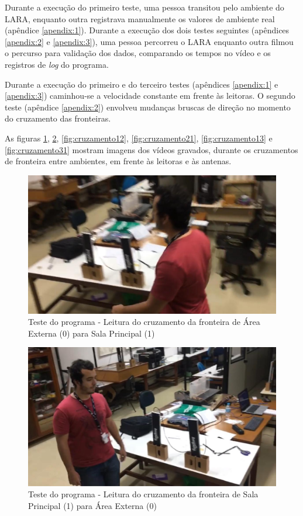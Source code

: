 Durante a execução do primeiro teste, uma pessoa transitou pelo ambiente do LARA, enquanto outra registrava manualmente os valores de ambiente real (apêndice \ref{apendix:1}). Durante a execução dos dois testes seguintes (apêndices \ref{apendix:2} e \ref{apendix:3}), uma pessoa percorreu o LARA enquanto outra filmou o percurso para validação dos dados, comparando os tempos no vídeo e os registros de \textit{log} do programa.

Durante a execução do primeiro e do terceiro testes (apêndices \ref{apendix:1} e \ref{apendix:3}) caminhou-se a velocidade constante em frente às leitoras. O segundo teste (apêndice \ref{apendix:2}) envolveu mudanças bruscas de direção no momento do cruzamento das fronteiras.

As figuras \ref{fig:cruzamento01}, \ref{fig:cruzamento10}, \ref{fig:cruzamento12}, \ref{fig:cruzamento21}, \ref{fig:cruzamento13} e \ref{fig:cruzamento31} mostram imagens dos vídeos gravados, durante os cruzamentos de fronteira entre ambientes, em frente às leitoras e às antenas.


\begin{figure}[H]
    \centering
    \includegraphics[width=0.5\linewidth]{figs/Resultados/cruzamento01.jpeg}
    \caption{Teste do programa - Leitura do cruzamento da fronteira de Área Externa (0) para Sala Principal (1)}
    \label{fig:cruzamento01}
\end{figure}

\begin{figure}[H]
    \centering
    \includegraphics[width=0.5\linewidth]{figs/Resultados/cruzamento10.jpeg}
    \caption{Teste do programa - Leitura do cruzamento da fronteira de Sala Principal (1) para Área Externa (0)}
    \label{fig:cruzamento10}
\end{figure}

